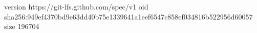 version https://git-lfs.github.com/spec/v1
oid sha256:949ef4370bd9e63dd40b75e1339641a1eef6547c858ef034816b522956d60057
size 196704
